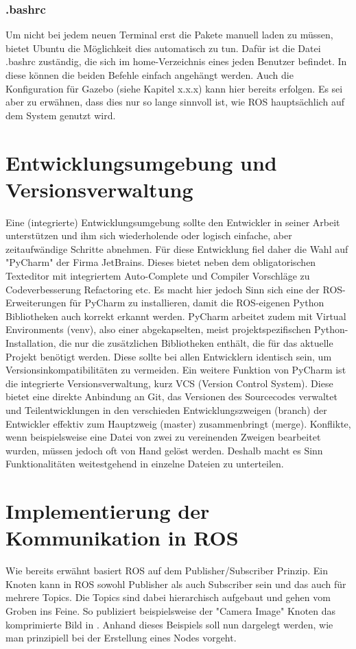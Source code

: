 \subsubsection{.bashrc}
Um nicht bei jedem neuen Terminal erst die Pakete manuell laden zu müssen, bietet Ubuntu die Möglichkeit dies automatisch zu tun. Dafür ist die Datei .bashrc zuständig, die sich im home-Verzeichnis eines jeden Benutzer befindet. In diese können die beiden Befehle einfach angehängt werden. Auch die Konfiguration für Gazebo (siehe Kapitel x.x.x) kann hier bereits erfolgen. Es sei aber zu erwähnen, dass dies nur so lange sinnvoll ist, wie ROS hauptsächlich auf dem System genutzt wird. 
\section{Entwicklungsumgebung und Versionsverwaltung}
Eine (integrierte) Entwicklungsumgebung sollte den Entwickler in seiner Arbeit unterstützen und ihm sich wiederholende oder logisch einfache, aber zeitaufwändige Schritte abnehmen. Für diese Entwicklung fiel daher die Wahl auf "PyCharm" der Firma JetBrains. Dieses bietet neben dem obligatorischen Texteditor mit integriertem Auto-Complete und Compiler Vorschläge zu Codeverbesserung Refactoring etc. Es macht hier jedoch Sinn sich eine der ROS-Erweiterungen für PyCharm zu installieren, damit die ROS-eigenen Python Bibliotheken auch korrekt erkannt werden. PyCharm arbeitet zudem mit Virtual Environments (venv), also einer abgekapselten, meist projektspezifischen Python-Installation, die nur die zusätzlichen Bibliotheken enthält, die für das aktuelle Projekt benötigt werden. Diese sollte bei allen Entwicklern identisch sein, um Versionsinkompatibilitäten zu vermeiden. Ein weitere Funktion von PyCharm ist die integrierte Versionsverwaltung, kurz VCS (Version Control System). Diese bietet eine direkte Anbindung an Git, das Versionen des Sourcecodes verwaltet und Teilentwicklungen in den verschieden Entwicklungszweigen (branch) der Entwickler effektiv zum Hauptzweig (master) zusammenbringt (merge). Konflikte, wenn beispielsweise eine Datei von zwei zu vereinenden Zweigen bearbeitet wurden, müssen jedoch oft von Hand gelöst werden. Deshalb macht es Sinn Funktionalitäten weitestgehend in einzelne Dateien zu unterteilen. 

\section{Implementierung der Kommunikation in ROS}
Wie bereits erwähnt basiert ROS auf dem Publisher/Subscriber Prinzip. Ein Knoten kann in ROS sowohl Publisher als auch Subscriber sein und das auch für mehrere Topics. Die Topics sind dabei hierarchisch aufgebaut und gehen vom Groben ins Feine. So publiziert beispielsweise der "Camera Image" Knoten das komprimierte Bild in . Anhand dieses Beispiels soll nun dargelegt werden, wie man prinzipiell bei der Erstellung eines Nodes vorgeht.
